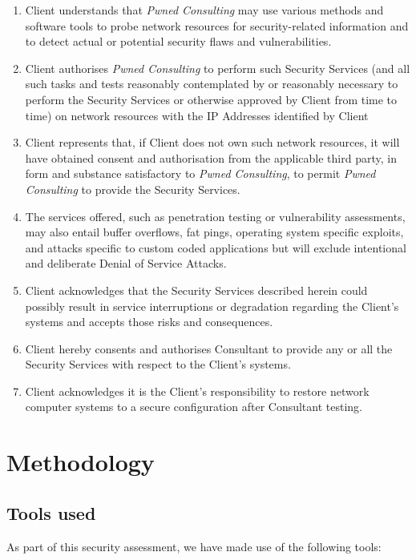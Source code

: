 \documentclass{article}[12 pt,a4paper]
\begin{document}
\begin{enumerate}
\item Client understands that \emph{Pwned Consulting} may use various methods and software tools to probe network resources for security-related information and to detect actual or potential security flaws and vulnerabilities. 
\item Client authorises \emph{Pwned Consulting} to perform such Security Services (and all such tasks and tests reasonably contemplated by or reasonably necessary to perform the Security Services or otherwise approved by Client from time to time) on network resources with the IP Addresses identified by Client
\item Client represents that, if Client does not own such network resources, it will have obtained consent and authorisation from the applicable third party, in form and substance satisfactory to \emph{Pwned Consulting}, to permit \emph{Pwned Consulting} to provide the Security Services. 
\item The services offered, such as penetration testing or vulnerability assessments, may also entail buffer overflows, fat pings, operating system specific exploits, and attacks specific to custom coded applications but will exclude intentional and deliberate Denial of Service Attacks.
\item Client acknowledges that the Security Services described herein could possibly result in service interruptions or degradation regarding the Client's systems and accepts those risks and consequences.
\item Client hereby consents and authorises Consultant to provide any or all the Security Services with respect to the Client's systems.
\item Client acknowledges it is the Client's responsibility to restore network computer systems to a secure configuration after Consultant testing. 
\end{enumerate}

\section{Methodology}

\subsection{Tools used}
As part of this security assessment, we have made use of the following tools:
\end{document}
